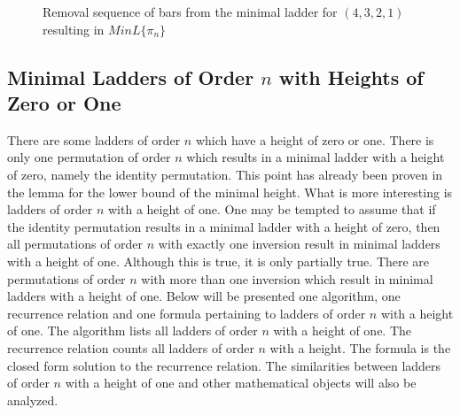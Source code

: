 \begin{figure}[h]

         \caption{Removal sequence of bars from the minimal ladder for $(4,3,2,1)$ resulting in $MinL\{\pi_{n}\}$}
        \label{Fig:RemovalSequence}
        \end{figure}
       


   \subsection{Minimal Ladders of Order $n$ with Heights of Zero or One}
   There are some ladders of order $n$ which have a height of zero or one.
   There is only one permutation of order $n$ which results in a minimal ladder with a height of zero, 
   namely the identity permutation. This point has already been proven in the lemma for the lower bound of the 
   minimal height. What is more interesting is ladders of order $n$ with a height of one. 
   One may be tempted to assume that if the identity permutation results in a minimal ladder 
   with a height of zero, then all permutations of order $n$ with exactly one inversion result in minimal ladders with a height of one.
   Although this is true, it is only partially true. There are permutations of order $n$ with more than one inversion 
   which result in minimal ladders with a height of one. Below will be presented one algorithm, one recurrence relation and one formula pertaining 
   to ladders of order $n$ with a height of one. The algorithm lists all ladders of order $n$ with a height of one. The recurrence relation
   counts all ladders of order $n$ with a height. The formula is the closed 
   form solution to the recurrence relation. The similarities between ladders of order $n$ with a height of one and other mathematical 
   objects will also be analyzed.\par 

